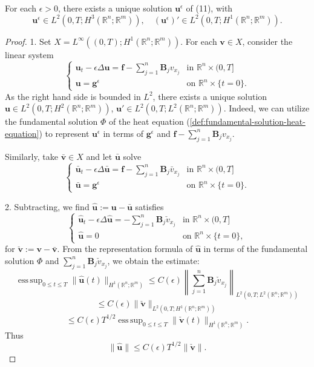 \begin{theorem}
\label{thm:symmetric-hyperbolic-approximate-solutions}
For each $\epsilon > 0$, there exists a unique solution $\mathbf{u}^\epsilon$ of (11), with
\[
\mathbf{u}^\epsilon \in L^2(0,T; H^3(\mathbb{R}^n; \mathbb{R}^m)), \quad (\mathbf{u}^\epsilon)' \in L^2(0,T; H^1(\mathbb{R}^n; \mathbb{R}^m)).
\tag{12}
\]
\end{theorem}

\begin{proof}
1. Set $X = L^\infty((0,T); H^1(\mathbb{R}^n; \mathbb{R}^m))$. For each $\mathbf{v} \in X$, consider the linear system
\[
\begin{cases}
\mathbf{u}_t - \epsilon \Delta \mathbf{u} = \mathbf{f} - \sum_{j=1}^n \mathbf{B}_j v_{x_j} & \text{in } \mathbb{R}^n \times (0,T] \\
\mathbf{u} = \mathbf{g}^\epsilon & \text{on } \mathbb{R}^n \times \{t=0\}.
\end{cases}
\]
As the right hand side is bounded in $L^2$, there exists a unique solution $\mathbf{u} \in L^2(0,T; H^2(\mathbb{R}^n; \mathbb{R}^m))$, $\mathbf{u}' \in L^2(0,T; L^2(\mathbb{R}^n; \mathbb{R}^m))$. Indeed, we can utilize the fundamental solution $\Phi$ of the heat equation (\cref{def:fundamental-solution-heat-equation}) to represent $\mathbf{u}^\epsilon$ in terms of $\mathbf{g}^\epsilon$ and $\mathbf{f} - \sum_{j=1}^n \mathbf{B}_j v_{x_j}$.

Similarly, take $\bar{\mathbf{v}} \in X$ and let $\bar{\mathbf{u}}$ solve
\[
\begin{cases}
\bar{\mathbf{u}}_t - \epsilon \Delta \bar{\mathbf{u}} = \mathbf{f} - \sum_{j=1}^n \mathbf{B}_j \bar{v}_{x_j} & \text{in } \mathbb{R}^n \times (0,T] \\
\bar{\mathbf{u}} = \mathbf{g}^\epsilon & \text{on } \mathbb{R}^n \times \{t=0\}.
\end{cases}
\]

2. Subtracting, we find $\hat{\mathbf{u}} := \mathbf{u} - \bar{\mathbf{u}}$ satisfies
\[
\begin{cases}
\hat{\mathbf{u}}_t - \epsilon \Delta \hat{\mathbf{u}} = -\sum_{j=1}^n \mathbf{B}_j \check{v}_{x_j} & \text{in } \mathbb{R}^n \times (0,T] \\
\hat{\mathbf{u}} = 0 & \text{on } \mathbb{R}^n \times \{t=0\},
\end{cases}
\tag{13}
\]
for $\check{\mathbf{v}} := \mathbf{v} - \bar{\mathbf{v}}$. From the representation formula of $\hat{\mathbf{u}}$ in terms of the fundamental solution $\Phi$ and $\sum_{j=1}^n \mathbf{B}_j \check{v}_{x_j}$, we obtain the estimate:
\[
\operatorname{ess\,sup}_{0 \le t \le T} \|\hat{\mathbf{u}}(t)\|_{H^1(\mathbb{R}^n;\mathbb{R}^m)} \le C(\epsilon) \left\| \sum_{j=1}^n \mathbf{B}_j \check{v}_{x_j} \right\|_{L^2(0,T;L^2(\mathbb{R}^n;\mathbb{R}^m))}
\]
\[
\le C(\epsilon) \|\check{\mathbf{v}}\|_{L^2(0,T;H^1(\mathbb{R}^n;\mathbb{R}^m))}
\]
\[
\le C(\epsilon) T^{1/2} \operatorname{ess\,sup}_{0 \le t \le T} \|\check{\mathbf{v}}(t)\|_{H^1(\mathbb{R}^n;\mathbb{R}^m)}.
\tag{14}
\]
Thus
\[
\|\hat{\mathbf{u}}\| \le C(\epsilon) T^{1/2} \|\check{\mathbf{v}}\|.
\tag{15}
\]


\end{proof}
